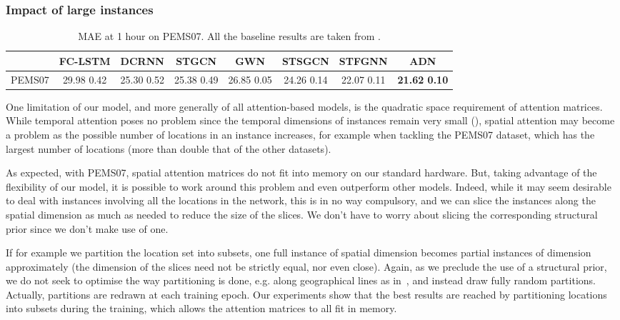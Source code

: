 \documentclass[a4paper]{article}
\begin{document}
\subsubsection{Impact of large instances}
\begin{table*}
    \centering
    \begin{tabular}{l || c  c  c  c  c  c | c }
         & FC-LSTM & DCRNN & STGCN & GWN & STSGCN & STFGNN & ADN \\
         \hline
         PEMS07 & 29.98  0.42 & 25.30  0.52 & 25.38  0.49 & 26.85  0.05 & 24.26  0.14 & 22.07  0.11 & \textbf{21.62  0.10} \\
        \hline
    \end{tabular}
    \caption{\label{fig:pems07-results}MAE at 1 hour on PEMS07. All the baseline results are taken from \cite{li_spatial-temporal_2021}.}
\end{table*}
One limitation of our model, and more generally of all attention-based models, is the quadratic space requirement of attention matrices. While temporal attention poses no problem since the temporal dimensions of instances remain very small (), spatial attention may become a problem as the possible number  of locations in an instance increases, for example when tackling the PEMS07 dataset, which has the largest number of locations (more than double that of the other datasets).

As expected, with PEMS07, spatial attention matrices do not fit into memory on our standard hardware. But, taking advantage of the flexibility of our model, it is possible to work around this problem and even outperform other models. Indeed, while it may seem desirable to deal with instances involving all the locations in the network, this is in no way compulsory, and we can slice the instances along the spatial dimension as much as needed to reduce the size of the slices. We don't have to worry about slicing the corresponding structural prior since we don't make use of one.

If for example we partition the location set into  subsets, one full instance of spatial dimension  becomes  partial instances of dimension approximately  (the dimension of the slices need not be strictly equal, nor even close). Again, as we preclude the use of a structural prior, we do not seek to optimise the way partitioning is done, e.g. along geographical lines as in~\cite{mallick_graph-partitioning-based_2020}, and instead draw fully random partitions. Actually, partitions are redrawn at each training epoch. Our experiments show that the best results are reached by partitioning locations into  subsets during the training, which allows the attention matrices to all fit in memory.
\end{document}
